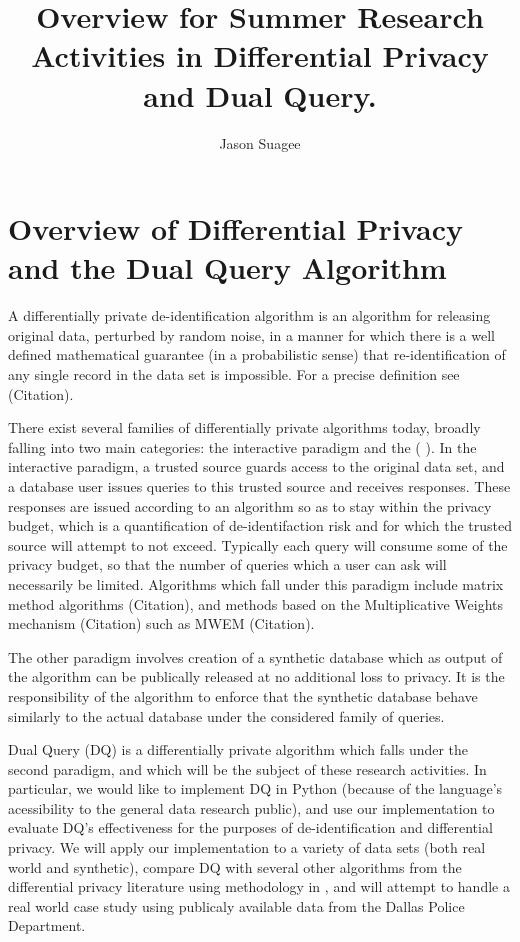 \documentclass{article}
\begin{document}
\title{Overview for Summer Research Activities in Differential Privacy and Dual Query.}
\author{Jason Suagee}
\maketitle
 
\section{Overview of Differential Privacy and the Dual Query Algorithm}
A differentially private de-identification algorithm is an algorithm for releasing original data, perturbed by random noise, in a manner for which there is a well defined mathematical guarantee (in a probabilistic sense) that re-identification of any single record in the data set is impossible. For a precise definition see (Citation).

There exist several families of differentially private algorithms today, broadly falling into two main categories: the interactive paradigm and the ( ). In the interactive paradigm, a trusted source guards access to the original data set, and a database user issues queries to this trusted source and receives responses. These responses are issued according to an algorithm so as to stay within the privacy budget, which is a quantification of de-identifaction risk and for which the trusted source will attempt to not exceed. Typically each query will consume some of the privacy budget, so that the number of queries which a user can ask will necessarily be limited. Algorithms which fall under this paradigm include matrix method algorithms (Citation), and methods based on the Multiplicative Weights mechanism (Citation) such as MWEM (Citation).

The other paradigm involves creation of a synthetic database which as output of the algorithm can be publically released at no additional loss to privacy. It is the responsibility of the algorithm to enforce that the synthetic database behave similarly to the actual database under the considered family of queries.

Dual Query (DQ) is a differentially private algorithm which falls under the second paradigm, and which will be the subject of these research activities. In particular, we would like to implement DQ in Python (because of the language's acessibility to the general data research public), and use our implementation to evaluate DQ's effectiveness for the purposes of de-identification and differential privacy. We will apply our implementation to a variety of data sets (both real world and synthetic), compare DQ with several other algorithms from the differential privacy literature using methodology in \cite{Hay:2016:PED:2882903.2882931}, and will attempt to handle a real world case study using publicaly available data from the Dallas Police Department.
\end{document}
